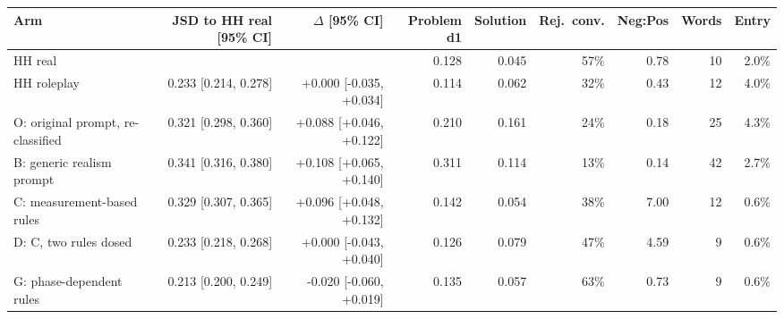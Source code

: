 \begin{tabular}{lrrrrrrrr}
\toprule
Arm & JSD to HH real [95\% CI] & $\Delta$ [95\% CI] & Problem d1 & Solution & Rej.\ conv. & Neg:Pos & Words & Entry \\
\midrule
HH real &  &  & 0.128 & 0.045 & 57\% & 0.78 & 10 & 2.0\% \\
HH roleplay & 0.233 [0.214, 0.278] & +0.000 [-0.035, +0.034] & 0.114 & 0.062 & 32\% & 0.43 & 12 & 4.0\% \\
\midrule
O: original prompt, re-classified & 0.321 [0.298, 0.360] & +0.088 [+0.046, +0.122] & 0.210 & 0.161 & 24\% & 0.18 & 25 & 4.3\% \\
B: generic realism prompt & 0.341 [0.316, 0.380] & +0.108 [+0.065, +0.140] & 0.311 & 0.114 & 13\% & 0.14 & 42 & 2.7\% \\
C: measurement-based rules & 0.329 [0.307, 0.365] & +0.096 [+0.048, +0.132] & 0.142 & 0.054 & 38\% & 7.00 & 12 & 0.6\% \\
D: C, two rules dosed & 0.233 [0.218, 0.268] & +0.000 [-0.043, +0.040] & 0.126 & 0.079 & 47\% & 4.59 & 9 & 0.6\% \\
G: phase-dependent rules & 0.213 [0.200, 0.249] & -0.020 [-0.060, +0.019] & 0.135 & 0.057 & 63\% & 0.73 & 9 & 0.6\% \\
\bottomrule
\end{tabular}
